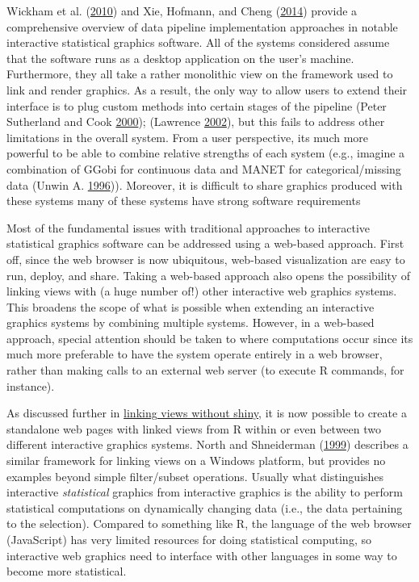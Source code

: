 \documentclass[12pt,]{isuthesis}
\begin{document}
Wickham et al. (\protect\hyperlink{ref-plumbing}{2010}) and Xie,
Hofmann, and Cheng (\protect\hyperlink{ref-Xie:2014co}{2014}) provide a
comprehensive overview of data pipeline implementation approaches in
notable interactive statistical graphics software. All of the systems
considered assume that the software runs as a desktop application on the
user's machine. Furthermore, they all take a rather monolithic view on
the framework used to link and render graphics. As a result, the only
way to allow users to extend their interface is to plug custom methods
into certain stages of the pipeline (Peter Sutherland and Cook
\protect\hyperlink{ref-orca}{2000}); (Lawrence
\protect\hyperlink{ref-ggobi-pipeline-design}{2002}), but this fails to
address other limitations in the overall system. From a user
perspective, its much more powerful to be able to combine relative
strengths of each system (e.g., imagine a combination of GGobi for
continuous data and MANET for categorical/missing data (Unwin A.
\protect\hyperlink{ref-MANET}{1996})). Moreover, it is difficult to
share graphics produced with these systems many of these systems have
strong software requirements

Most of the fundamental issues with traditional approaches to
interactive statistical graphics software can be addressed using a
web-based approach. First off, since the web browser is now ubiquitous,
web-based visualization are easy to run, deploy, and share. Taking a
web-based approach also opens the possibility of linking views with (a
huge number of!) other interactive web graphics systems. This broadens
the scope of what is possible when extending an interactive graphics
systems by combining multiple systems. However, in a web-based approach,
special attention should be taken to where computations occur since its
much more preferable to have the system operate entirely in a web
browser, rather than making calls to an external web server (to execute
R commands, for instance).

As discussed further in
\protect\hyperlink{linking-views-without-shiny}{linking views without
shiny}, it is now possible to create a standalone web pages with linked
views from R within or even between two different interactive graphics
systems. North and Shneiderman
(\protect\hyperlink{ref-North:1999vi}{1999}) describes a similar
framework for linking views on a Windows platform, but provides no
examples beyond simple filter/subset operations. Usually what
distinguishes interactive \emph{statistical} graphics from interactive
graphics is the ability to perform statistical computations on
dynamically changing data (i.e., the data pertaining to the selection).
Compared to something like R, the language of the web browser
(JavaScript) has very limited resources for doing statistical computing,
so interactive web graphics need to interface with other languages in
some way to become more statistical.
\end{document}
